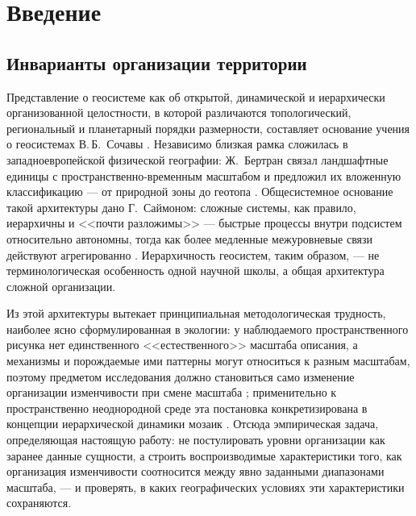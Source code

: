 \documentclass[11pt,a4paper]{article}
\begin{document}
\section{Введение}
\label{sec:intro}

\subsection{Инварианты организации территории}

Представление о геосистеме как об открытой, динамической и иерархически организованной целостности, в которой различаются топологический, региональный и планетарный порядки размерности, составляет основание учения о геосистемах В.\,Б.~Сочавы \cite{Sochava1978}. Независимо близкая рамка сложилась в западноевропейской физической географии: Ж.~Бертран связал ландшафтные единицы с пространственно-временным масштабом и предложил их вложенную классификацию --- от природной зоны до геотопа \cite{Bertrand1968}. Общесистемное основание такой архитектуры дано Г.~Саймоном: сложные системы, как правило, иерархичны и <<почти разложимы>> --- быстрые процессы внутри подсистем относительно автономны, тогда как более медленные межуровневые связи действуют агрегированно \cite{Simon1962}. Иерархичность геосистем, таким образом, --- не терминологическая особенность одной научной школы, а общая архитектура сложной организации.

Из этой архитектуры вытекает принципиальная методологическая трудность, наиболее ясно сформулированная в экологии: у наблюдаемого пространственного рисунка нет единственного <<естественного>> масштаба описания, а механизмы и порождаемые ими паттерны могут относиться к разным масштабам, поэтому предметом исследования должно становиться само изменение организации изменчивости при смене масштаба \cite{Levin1992}; применительно к пространственно неоднородной среде эта постановка конкретизирована в концепции иерархической динамики мозаик \cite{WuLoucks1995}. Отсюда эмпирическая задача, определяющая настоящую работу: не постулировать уровни организации как заранее данные сущности, а строить воспроизводимые характеристики того, как организация изменчивости соотносится между явно заданными диапазонами масштаба, --- и проверять, в каких географических условиях эти характеристики сохраняются.
\end{document}
